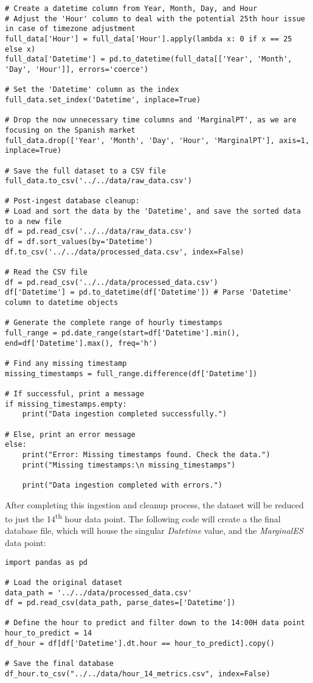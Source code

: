 \documentclass[12pt]{report} %
\begin{document}
\begin{lstlisting}
# Create a datetime column from Year, Month, Day, and Hour
# Adjust the 'Hour' column to deal with the potential 25th hour issue in case of timezone adjustment
full_data['Hour'] = full_data['Hour'].apply(lambda x: 0 if x == 25 else x)
full_data['Datetime'] = pd.to_datetime(full_data[['Year', 'Month', 'Day', 'Hour']], errors='coerce')

# Set the 'Datetime' column as the index
full_data.set_index('Datetime', inplace=True)

# Drop the now unnecessary time columns and 'MarginalPT', as we are focusing on the Spanish market
full_data.drop(['Year', 'Month', 'Day', 'Hour', 'MarginalPT'], axis=1, inplace=True)

# Save the full dataset to a CSV file
full_data.to_csv('../../data/raw_data.csv')

# Post-ingest database cleanup:
# Load and sort the data by the 'Datetime', and save the sorted data to a new file
df = pd.read_csv('../../data/raw_data.csv')
df = df.sort_values(by='Datetime')
df.to_csv('../../data/processed_data.csv', index=False)

# Read the CSV file
df = pd.read_csv('../../data/processed_data.csv')
df['Datetime'] = pd.to_datetime(df['Datetime']) # Parse 'Datetime' column to datetime objects

# Generate the complete range of hourly timestamps
full_range = pd.date_range(start=df['Datetime'].min(), end=df['Datetime'].max(), freq='h')

# Find any missing timestamp
missing_timestamps = full_range.difference(df['Datetime'])

# If successful, print a message
if missing_timestamps.empty:
    print("Data ingestion completed successfully.")

# Else, print an error message
else:
    print("Error: Missing timestamps found. Check the data.")
    print("Missing timestamps:\n missing_timestamps")

    print("Data ingestion completed with errors.")
\end{lstlisting}

After completing this ingestion and cleanup process, the dataset will be reduced to just the 14\textsuperscript{th} hour data point. The following code will create a the final database file, which will house the singular \textit{Datetime} value, and the \textit{MarginalES} data point:

\begin{lstlisting}
import pandas as pd

# Load the original dataset
data_path = '../../data/processed_data.csv'
df = pd.read_csv(data_path, parse_dates=['Datetime'])

# Define the hour to predict and filter down to the 14:00H data point
hour_to_predict = 14
df_hour = df[df['Datetime'].dt.hour == hour_to_predict].copy()

# Save the final database
df_hour.to_csv("../../data/hour_14_metrics.csv", index=False)
\end{lstlisting}
\end{document}
